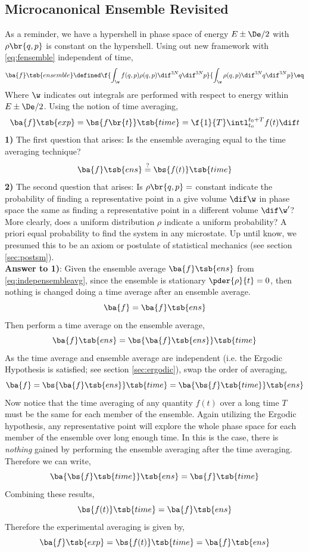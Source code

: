 \documentclass{article}
\begin{document}
\subsection{Microcanonical Ensemble Revisited}
As a reminder, we have a hypershell in phase space of energy $E \pm \De / 2$ with $\rho\br{q,p}$ is constant on the hypershell. Using out new framework with \eqref{eq:fensemble} independent of time,
\[ \ba{f}\tsb{ensemble} \defined \f{\int_{\w} f(q,p) \rho(q,p) \dif^{3N}q\dif^{3N}p}{\int_{\w}\rho(q,p) \dif^{3N}q\dif^{3N}p} \eq \label{eq:indepensembleavg} \]
Where $\w$ indicates out integrals are performed with respect to energy within $E \pm \De / 2$. Using the notion of time averaging,
\[ \ba{f}\tsb{exp} = \bs{f\br{t}}\tsb{time} = \f{1}{T}\intl_{t_0}^{t_0 + T} f(t) \dif t \]
\textbf{1)} The first question that arises: Is the ensemble averaging equal to the time averaging technique?
\[ \ba{f}\tsb{ens} \stackrel{?}{=} \bs{f(t)}\tsb{time} \]
\textbf{2)} The second question that arises: Is $\rho\br{q,p} = $ constant indicate the probability of finding a representative point in a give volume $\dif \w$ in phase space the same as finding a representative point in a different volume $\dif \w'$? More clearly, does a uniform distribution $\rho$ indicate a uniform probability? A priori equal probability to find the system in any microstate. Up until know, we presumed this to be an axiom or postulate of statistical mechanics (see section \ref{sec:postsm}). \\

\textbf{Answer to 1)}:
Given the ensemble average $\ba{f}\tsb{ens}$ from \eqref{eq:indepensembleavg}, since the ensemble is stationary $\pder{\rho}{t} = 0$, then nothing is changed doing a time average after an ensemble average.
\[ \ba{f} = \ba{f}\tsb{ens} \]
Then perform a time average on the ensemble average,
\[ \ba{f}\tsb{ens} = \bs{\ba{f}\tsb{ens}}\tsb{time} \]
As the time average and ensemble average are independent (i.e. the Ergodic Hypothesis is satisfied; see section \ref{sec:ergodic}), swap the order of averaging,
\[ \ba{f} = \bs{\ba{f}\tsb{ens}}\tsb{time} = \ba{\bs{f}\tsb{time}}\tsb{ens} \]
Now notice that the time averaging of any quantity $f(t)$ over a long time $T$ must be the same for each member of the ensemble. Again utilizing the Ergodic hypothesis, any representative point will explore the whole phase space for each member of the ensemble over long enough time. In this is the case, there is \textit{nothing} gained by performing the ensemble averaging after the time averaging. Therefore we can write,
\[ \ba{\bs{f}\tsb{time}}\tsb{ens} = \bs{f}\tsb{time} \]
Combining these results,
\[ \bs{f(t)}\tsb{time} = \ba{f}\tsb{ens} \]
Therefore the experimental averaging is given by,
\[ \ba{f}\tsb{exp} = \bs{f(t)}\tsb{time} = \ba{f}\tsb{ens} \]
\end{document}
